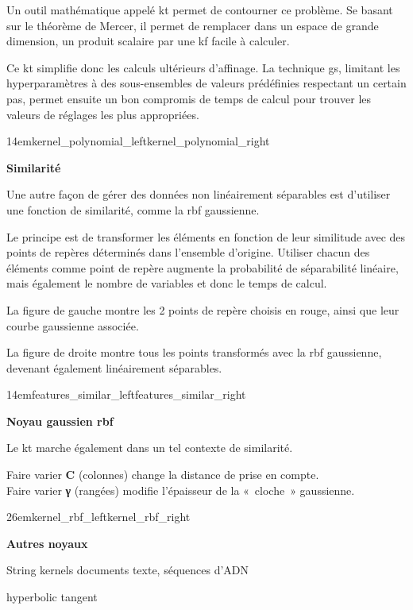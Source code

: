 Un outil mathématique appelé \gls{kt} permet de contourner ce problème.
Se basant sur le théorème de Mercer, il permet de remplacer dans un espace
de grande dimension, un produit scalaire par une \gls{kf} facile à calculer.

Ce \gls{kt} simplifie donc les calculs ultérieurs d’affinage.
La technique \gls{gs}, limitant les hyperparamètres à des sous-ensembles
de valeurs prédéfinies respectant un certain pas, permet ensuite un bon
compromis de temps de calcul pour trouver les valeurs de réglages
les plus appropriées.

{14em}{kernel_polynomial_left}{kernel_polynomial_right}

\textbf{Similarité}

Une autre façon de gérer des données non linéairement séparables
est d’utiliser une fonction de similarité, comme la \gls{rbf} gaussienne.

Le principe est de transformer les éléments en fonction de leur similitude
avec des points de repères déterminés dans l’ensemble d’origine.
Utiliser chacun des éléments comme point de repère augmente la probabilité
de séparabilité linéaire, mais également le nombre de variables et donc
le temps de calcul.

La figure de gauche montre les 2 points de repère choisis en rouge,
ainsi que leur courbe gaussienne associée.

La figure de droite montre tous les points transformés avec la \gls{rbf}
gaussienne, devenant également linéairement séparables.

{14em}{features_similar_left}{features_similar_right}

\textbf{Noyau gaussien \gls{rbf}}

Le \gls{kt} marche également dans un tel contexte de similarité.

Faire varier \textbf{C} (colonnes) change la distance de prise en compte.\\
Faire varier \textbf{γ} (rangées) modifie l’épaisseur de la « cloche » gaussienne.

{26em}{kernel_rbf_left}{kernel_rbf_right}

\pagebreak

\textbf{Autres noyaux}

\begin{itmz}
\item{String kernels documents texte, séquences d’ADN}
\item{hyperbolic tangent}
\end{itmz}

